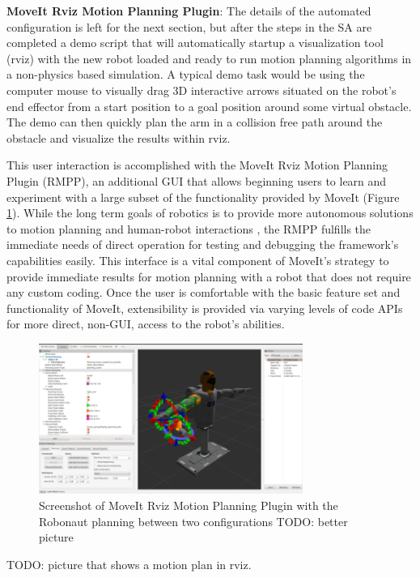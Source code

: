\documentclass[10pt,journal,compsoc]{joser1}
\begin{document}
{{\bf MoveIt Rviz Motion Planning Plugin}: The details of the automated configuration is left for the next section, but after the steps in the SA are completed a demo script that will automatically startup a visualization tool (rviz) with the new robot loaded and ready to run motion planning algorithms in a non-physics based simulation. A typical demo task would be using the computer mouse to visually drag 3D interactive arrows situated on the robot's end effector from a start position to a goal position around some virtual obstacle. The demo can then quickly plan the arm in a collision free path around the obstacle and visualize the results within rviz. 

This user interaction is accomplished with the MoveIt Rviz Motion Planning Plugin (RMPP), an additional GUI that allows beginning users to learn and experiment with a large subset of the functionality provided by MoveIt (Figure \ref{fig:motionrvizplugin}). While the long term goals of robotics is to provide more autonomous solutions to motion planning and human-robot interactions \cite{yancotaxonomy}, the RMPP fulfills the immediate needs of direct operation for testing and debugging the framework's capabilities easily. This interface is a vital component of MoveIt's strategy to provide immediate results for motion planning with a robot that does not require any custom coding. Once the user is comfortable with the basic feature set and functionality of MoveIt, extensibility is provided via varying levels of code APIs for more direct, non-GUI, access to the robot's abilities.

\begin{figure}[!t]
\centering
\includegraphics[width=3.4in]{images/rviz_plugin}
\caption{Screenshot of MoveIt Rviz Motion Planning Plugin with the Robonaut planning between two configurations TODO: better picture}
\label{fig:motionrvizplugin}
\end{figure}

TODO: picture that shows a motion plan in rviz.

}
\end{document}
